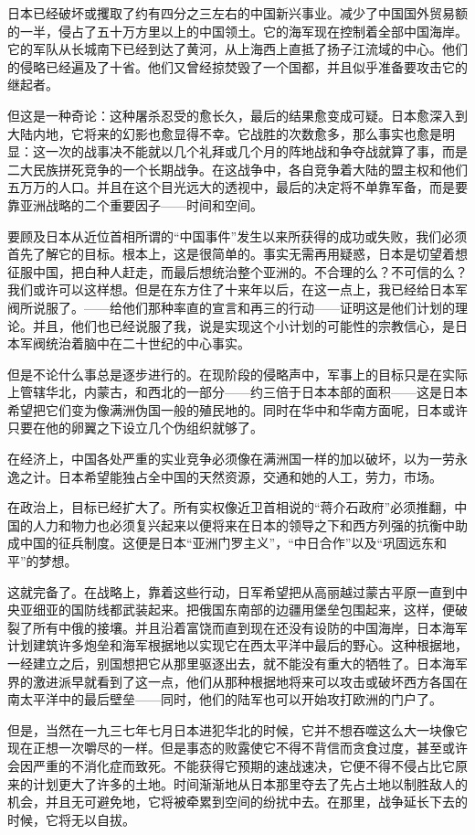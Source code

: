 \documentclass[10pt]{book}
\begin{document}
日本已经破坏或攫取了约有四分之三左右的中国新兴事业。减少了中国国外贸易额的一半，侵占了五十万方里以上的中国领土。它的海军现在控制着全部中国海岸。它的军队从长城南下已经到达了黄河，从上海西上直抵了扬子江流域的中心。他们的侵略已经遍及了十省。他们又曾经掠焚毁了一个国都，并且似乎准备要攻击它的继起者。

但这是一种奇论：这种屠杀忍受的愈长久，最后的结果愈变成可疑。日本愈深入到大陆内地，它将来的幻影也愈显得不幸。它战胜的次数愈多，那么事实也愈是明显：这一次的战事决不能就以几个礼拜或几个月的阵地战和争夺战就算了事，而是二大民族拼死竞争的一个长期战争。在这战争中，各自竞争着大陆的盟主权和他们五万万的人口。并且在这个目光远大的透视中，最后的决定将不单靠军备，而是要靠亚洲战略的二个重要因子——时间和空间。

要顾及日本从近位首相所谓的“中国事件”发生以来所获得的成功或失败，我们必须首先了解它的目标。根本上，这是很简单的。事实无需再用疑惑，日本是切望着想征服中国，把白种人赶走，而最后想统治整个亚洲的。不合理的么？不可信的么？我们或许可以这样想。但是在东方住了十来年以后，在这一点上，我已经给日本军阀所说服了。——给他们那种率直的宣言和再三的行动——证明这是他们计划的理论。并且，他们也已经说服了我，说是实现这个小计划的可能性的宗教信心，是日本军阀统治着脑中在二十世纪的中心事实。

但是不论什么事总是逐步进行的。在现阶段的侵略声中，军事上的目标只是在实际上管辖华北，内蒙古，和西北的一部分——约三倍于日本本部的面积——这是日本希望把它们变为像满洲伪国一般的殖民地的。同时在华中和华南方面呢，日本或许只要在他的卵翼之下设立几个伪组织就够了。

在经济上，中国各处严重的实业竞争必须像在满洲国一样的加以破坏，以为一劳永逸之计。日本希望能独占全中国的天然资源，交通和她的人工，劳力，市场。

在政治上，目标已经扩大了。所有实权像近卫首相说的“蒋介石政府”必须推翻，中国的人力和物力也必须复兴起来以便将来在日本的领导之下和西方列强的抗衡中助成中国的征兵制度。这便是日本“亚洲门罗主义”，“中日合作”以及“巩固远东和平”的梦想。

这就完备了。在战略上，靠着这些行动，日军希望把从高丽越过蒙古平原一直到中央亚细亚的国防线都武装起来。把俄国东南部的边疆用堡垒包围起来，这样，便破裂了所有中俄的接壤。并且沿着富饶而直到现在还没有设防的中国海岸，日本海军计划建筑许多炮垒和海军根据地以实现它在西太平洋中最后的野心。这种根据地，一经建立之后，别国想把它从那里驱逐出去，就不能没有重大的牺牲了。日本海军界的激进派早就看到了这一点，他们从那种根据地将来可以攻击或破坏西方各国在南太平洋中的最后壁垒——同时，他们的陆军也可以开始攻打欧洲的门户了。

但是，当然在一九三七年七月日本进犯华北的时候，它并不想吞噬这么大一块像它现在正想一次嚼尽的一样。但是事态的败露使它不得不背信而贪食过度，甚至或许会因严重的不消化症而致死。不能获得它预期的速战速决，它便不得不侵占比它原来的计划更大了许多的土地。时间渐渐地从日本那里夺去了先占土地以制胜敌人的机会，并且无可避免地，它将被牵累到空间的纷扰中去。在那里，战争延长下去的时候，它将无以自拔。
\end{document}
